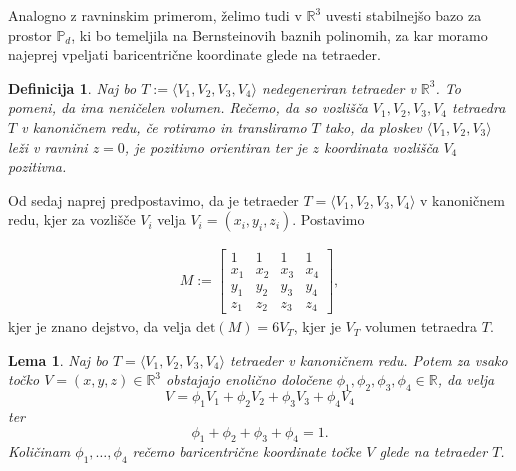 \documentclass[11pt,a4paper]{article}
\newtheorem{definition}{Definicija}
\newtheorem{lemma}{Lema}
\begin{document}
Analogno z ravninskim primerom, želimo tudi 
v $\mathbb{R}^3$ uvesti stabilnejšo bazo za prostor 
$\mathbb{P}_d$, ki bo temeljila na Bernsteinovih baznih polinomih,
za kar moramo najeprej vpeljati baricentrične koordinate glede na
tetraeder.

\begin{definition}
    Naj bo $T := \langle V_1 , V_2 , V_3, V_4\rangle$ nedegeneriran tetraeder
    v $\mathbb{R}^3$. To pomeni, da ima neničelen volumen. Rečemo, da so 
    vozlišča $V_1 , V_2 , V_3, V_4$ tetraedra $T$ v kanoničnem redu,
    če rotiramo in transliramo $T$ tako, da ploskev
    $\langle V_1, V_2, V_3\rangle$ leži v ravnini $z = 0$, je pozitivno
    orientiran ter je $z$ koordinata vozlišča $V_4$ pozitivna.
\end{definition}

Od sedaj naprej predpostavimo, da je tetraeder $T = \langle V_1, V_2, V_3,V_4 \rangle$ v kanoničnem redu,
kjer za vozlišče $V_i$ velja $V_i = (x_i, y_i, z_i)$. Postavimo 

\begin{align}
    M := \begin{bmatrix}
        1 & 1 & 1 & 1 \\
        x_1 & x_2 & x_3 & x_4 \\
        y_1 & y_2 & y_3 & y_4 \\
        z_1 & z_2 & z_3 & z_4
    \end{bmatrix},
\end{align}
kjer je znano dejstvo, da velja $\text{det}(M) = 6V_T$, kjer je $V_T$ volumen tetraedra $T$. 


\begin{lemma}\label{lema_baricentricne}
    Naj bo $T = \langle V_1, V_2, V_3, V_4 \rangle$ tetraeder v kanoničnem redu.
    Potem za vsako točko $V = (x,y,z) \in \mathbb{R}^3$ obstajajo enolično določene
     $\phi_1, \phi_2, \phi_3, \phi_4 \in \mathbb{R}$,
    da velja 
    \begin{equation}\label{eq_baricentricne}
        V = \phi_1 V_1 + \phi_2 V_2 + \phi_3 V_3 + \phi_4 V_4
    \end{equation} ter 
    \begin{equation}\label{eq_particija}
        \phi_1 + \phi_2 + \phi_3 + \phi_4 = 1 .
    \end{equation}
    Količinam $\phi_1, \ldots, \phi_4$ rečemo baricentrične 
    koordinate točke $V$ glede na tetraeder $T$.
\end{lemma}
\end{document}
